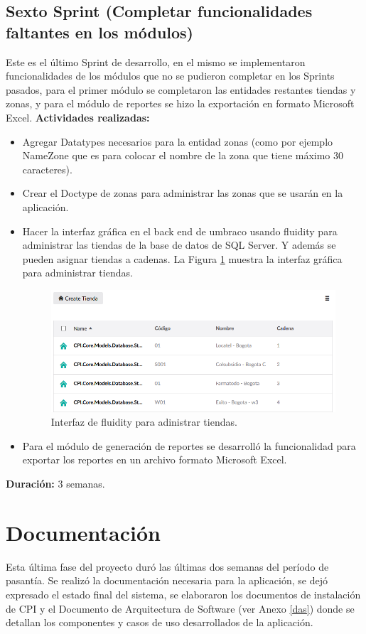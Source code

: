 \subsection{Sexto Sprint (Completar funcionalidades faltantes en los módulos)}
Este es el último Sprint de desarrollo, en el mismo se implementaron funcionalidades de los módulos que no se pudieron completar en los Sprints pasados, para el primer módulo se completaron las entidades restantes tiendas y zonas, y para el módulo de reportes se hizo la exportación en formato Microsoft Excel.
\vskip 0.5cm
\textbf{Actividades realizadas:}
\begin{itemize}
  \item Agregar Datatypes necesarios para la entidad zonas (como por ejemplo NameZone que es para colocar el nombre de la zona que tiene máximo 30 caracteres).
  \item Crear el Doctype de zonas para administrar las zonas que se usarán en la aplicación.
  \item Hacer la interfaz gráfica en el back end de umbraco usando fluidity para administrar las tiendas de la base de datos de SQL Server. Y además se pueden asignar tiendas a cadenas. La Figura \ref{fig:fluidity_tiendas} muestra la interfaz gráfica para administrar tiendas.
  \begin{figure}[H]
    \begin{center}
    \includegraphics[scale=0.5]{tiendas.png}
    \caption{Interfaz de fluidity para adinistrar tiendas.}
    \label{fig:fluidity_tiendas}
    \end{center}
    \end{figure}


  \item Para el módulo de generación de reportes se desarrolló la funcionalidad para exportar los reportes en un archivo formato Microsoft Excel.
\end{itemize}

\textbf{Duración:} 3 semanas.

\vskip 0.5cm


\section{Documentación} \label{documentation}
Esta última fase del proyecto duró las últimas dos semanas del período de pasantía. Se realizó la documentación necesaria para la aplicación, se dejó expresado el estado final del sistema, se elaboraron los documentos de instalación de CPI y el Documento de Arquitectura de Software (ver Anexo \ref{das}) donde se detallan los componentes y casos de uso desarrollados de la aplicación.




